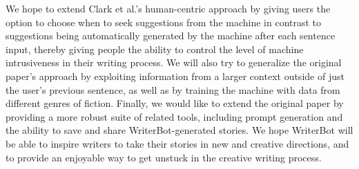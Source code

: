 We hope to extend Clark et al.’s\cite{clark} human-centric approach by giving users the
option to choose when to seek suggestions from the machine \cite{creative_help}
in contrast to suggestions being automatically generated by the machine after
each sentence input, thereby giving people the ability to control the level of
machine intrusiveness in their writing process.  We will also try to generalize
the original paper’s approach by exploiting information from a larger context
outside of just the user’s previous sentence, as well as by training the machine
with data from different genres of fiction.  Finally, we would like to extend the
original paper by providing a more robust suite of related tools, including prompt
generation and the ability to save and share WriterBot-generated stories.
We hope WriterBot will be able to inspire writers to take their stories in
new and creative directions, and to provide an enjoyable way to get unstuck
in the creative writing process.

